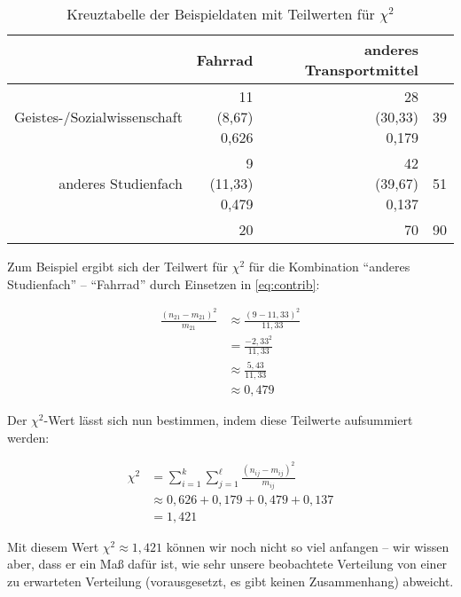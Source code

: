 \documentclass[
  ngerman,
]{article}
\begin{document}
\begin{table}

\caption{\label{tab:radchisq}Kreuztabelle der Beispieldaten mit Teilwerten für $\chi^2$}
\centering
\begin{tabular}[t]{>{}r|r>{}r|r}
\toprule
 & Fahrrad & anderes Transportmittel & \\
\midrule
Geistes-/Sozialwissenschaft & \makecell[tr]{11\\(8,67)\\\textcolor{goethe_blue}{0,626}} & \makecell[tr]{28\\(30,33)\\\textcolor{goethe_blue}{0,179}} & 39\\
anderes Studienfach & \makecell[tr]{9\\(11,33)\\\textcolor{goethe_blue}{0,479}} & \makecell[tr]{42\\(39,67)\\\textcolor{goethe_blue}{0,137}} & 51\\
\midrule
 & 20 & 70 & 90\\
\bottomrule
\end{tabular}
\end{table}

Zum Beispiel ergibt sich der Teilwert für \(\chi^2\) für die Kombination ``anderes Studienfach'' -- ``Fahrrad'' durch Einsetzen in \autoref{eq:contrib}:

\nopagebreak

\[\begin{aligned}
\frac{(n_{21}-m_{21})^{2}}{m_{21}} &\approx \frac{(9-11,33)^2}{11,33}\\
&=\frac{-2,33^2}{11,33}\\
&\approx\frac{5,43}{11,33}\\
&\approx0,479
\end{aligned}\]

Der \(\chi^2\)-Wert lässt sich nun bestimmen, indem diese Teilwerte aufsummiert werden:

\[\begin{aligned}
\chi^2&= \sum_{i=1}^{k}\sum_{j=1}^{\ell}\frac{(n_{ij}-m_{ij})^{2}}{m_{ij}}\\[4pt]
&\approx 0,626 + 0,179 + 0,479 + 0,137\\
& =1,421
\end{aligned}\]

Mit diesem Wert \(\chi^2\approx1,421\) können wir noch nicht so viel anfangen -- wir wissen aber, dass er ein Maß dafür ist, wie sehr unsere beobachtete Verteilung von einer zu erwarteten Verteilung (vorausgesetzt, es gibt keinen Zusammenhang) abweicht.
\end{document}
